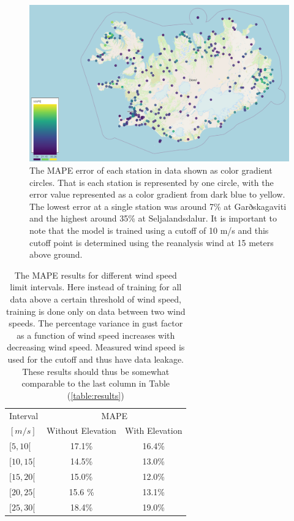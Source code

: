\begin{figure}[h]
    \centering
    \includegraphics[scale = 0.5]{Figures/errorMap.png}
    \caption[MAPE error distribution of stations shown on a map of Iceland.]{The MAPE error of each station in data shown as color gradient circles. That is each station is represented by one circle, with the error value represented as a color gradient from dark blue to yellow. The lowest error at a single station was around 7\% at Garðskagaviti and the highest around 35\% at Seljalandsdalur. It is important to note that the model is trained using a cutoff of 10 m/s and this cutoff point is determined using the reanalysis wind at 15 meters above ground.}
    \label{fig:errorMap}
\end{figure}

\begin{table}[h]
    \caption[Model result looking at closed wind speed intervals]{The MAPE results for different wind speed limit intervals. Here instead of training for all data above a certain threshold of wind speed, training is done only on data between two wind speeds. The percentage variance in gust factor as a function of wind speed increases with decreasing wind speed. Measured wind speed is used for the cutoff and thus have data leakage. These results should thus be somewhat comparable to the last column in Table (\ref{table:results})}
    \label{table:closed_intervals}
    \centering
    \begin{tabular}{lcc}
        \toprule
        Interval &  \multicolumn{2}{c}{MAPE}\\
        $[m/s]$ & Without Elevation & With Elevation\\
        \midrule
        $[5, 10[$ & 17.1\% & 16.4\%\\
        $[10, 15[$ & 14.5\% & 13.0\%\\
        $[15, 20[$ & 15.0\% & 12.0\%\\
        $[20, 25[$ & 15.6 \% & 13.1\%\\
        $[25, 30[$ & 18.4\% & 19.0\%\\
        \bottomrule
    \end{tabular}
\end{table}

